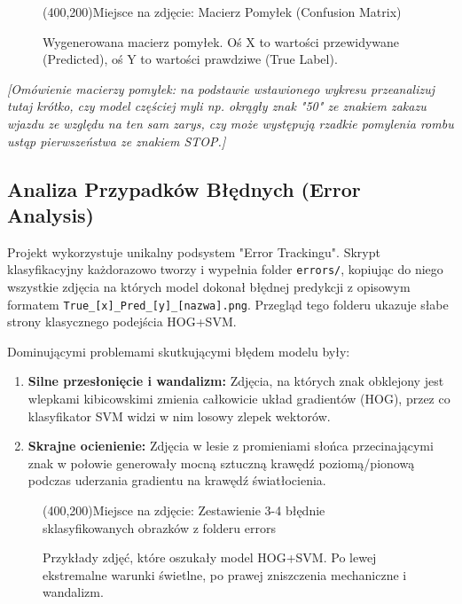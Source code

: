 \documentclass[12pt,a4paper]{article}
\newcommand{\placeholderimage}[2]{
    \begin{figure}[H]
        \centering
        \framebox(400,200){Miejsce na zdjęcie: #1}
        \caption{#2}
    \end{figure}
}
\begin{document}
\placeholderimage{Macierz Pomyłek (Confusion Matrix)}{Wygenerowana macierz pomyłek. Oś X to wartości przewidywane (Predicted), oś Y to wartości prawdziwe (True Label).}

\textit{[Omówienie macierzy pomyłek: na podstawie wstawionego wykresu przeanalizuj tutaj krótko, czy model częściej myli np. okrągły znak "50" ze znakiem zakazu wjazdu ze względu na ten sam zarys, czy może występują rzadkie pomylenia rombu ustąp pierwszeństwa ze znakiem STOP.]}

\subsection{Analiza Przypadków Błędnych (Error Analysis)}
Projekt wykorzystuje unikalny podsystem "Error Trackingu". Skrypt klasyfikacyjny każdorazowo tworzy i wypełnia folder \texttt{errors/}, kopiując do niego wszystkie zdjęcia na których model dokonał błędnej predykcji z opisowym formatem \texttt{True\_[x]\_Pred\_[y]\_[nazwa].png}. Przegląd tego folderu ukazuje słabe strony klasycznego podejścia HOG+SVM. 

Dominującymi problemami skutkującymi błędem modelu były:
\begin{enumerate}
    \item \textbf{Silne przesłonięcie i wandalizm:} Zdjęcia, na których znak obklejony jest wlepkami kibicowskimi zmienia całkowicie układ gradientów (HOG), przez co klasyfikator SVM widzi w nim losowy zlepek wektorów.
    \item \textbf{Skrajne ocienienie:} Zdjęcia w lesie z promieniami słońca przecinającymi znak w połowie generowały mocną sztuczną krawędź poziomą/pionową podczas uderzania gradientu na krawędź światłocienia.
\end{enumerate}

\placeholderimage{Zestawienie 3-4 błędnie sklasyfikowanych obrazków z folderu errors}{Przykłady zdjęć, które oszukały model HOG+SVM. Po lewej ekstremalne warunki świetlne, po prawej zniszczenia mechaniczne i wandalizm.}
\end{document}
